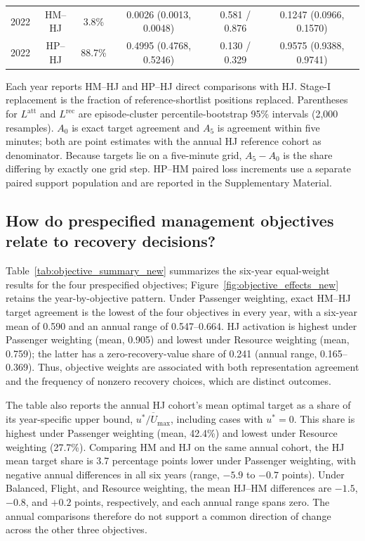 \begin{table}[pos=t]
{\begin{tabular}{cccccc}
2022 & HM--HJ & 3.8\% & 0.0026 (0.0013, 0.0048) & 0.581 / 0.876 & 0.1247 (0.0966, 0.1570) \\
2022 & HP--HJ & 88.7\% & 0.4995 (0.4768, 0.5246) & 0.130 / 0.329 & 0.9575 (0.9388, 0.9741) \\
\bottomrule
\end{tabular}}
\par\vspace{3pt}
\begin{minipage}{0.98\linewidth}
\footnotesize
Each year reports HM--HJ and HP--HJ direct comparisons with HJ. Stage-I replacement is the fraction of reference-shortlist positions replaced. Parentheses for $L^{\mathrm{att}}$ and $L^{\mathrm{rec}}$ are episode-cluster percentile-bootstrap 95\% intervals (2,000 resamples). $A_0$ is exact target agreement and $A_5$ is agreement within five minutes; both are point estimates with the annual HJ reference cohort as denominator. Because targets lie on a five-minute grid, $A_5-A_0$ is the share differing by exactly one grid step. HP--HM paired loss increments use a separate paired support population and are reported in the Supplementary Material.
\end{minipage}
\end{table}

\subsection{How do prespecified management objectives relate to recovery decisions?}
\label{subsec:results_objectives}

Table~\ref{tab:objective_summary_new} summarizes the six-year equal-weight results for the four prespecified objectives; Figure~\ref{fig:objective_effects_new} retains the year-by-objective pattern. Under Passenger weighting, exact HM--HJ target agreement is the lowest of the four objectives in every year, with a six-year mean of 0.590 and an annual range of 0.547--0.664. HJ activation is highest under Passenger weighting (mean, 0.905) and lowest under Resource weighting (mean, 0.759); the latter has a zero-recovery-value share of 0.241 (annual range, 0.165--0.369). Thus, objective weights are associated with both representation agreement and the frequency of nonzero recovery choices, which are distinct outcomes.

The table also reports the annual HJ cohort's mean optimal target as a share of its year-specific upper bound, $\overline{u^*/U_{\max}}$, including cases with $u^*=0$. This share is highest under Passenger weighting (mean, 42.4\%) and lowest under Resource weighting (27.7\%). Comparing HM and HJ on the same annual cohort, the HJ mean target share is 3.7 percentage points lower under Passenger weighting, with negative annual differences in all six years (range, $-5.9$ to $-0.7$ points). Under Balanced, Flight, and Resource weighting, the mean HJ--HM differences are $-1.5$, $-0.8$, and $+0.2$ points, respectively, and each annual range spans zero. The annual comparisons therefore do not support a common direction of change across the other three objectives.

